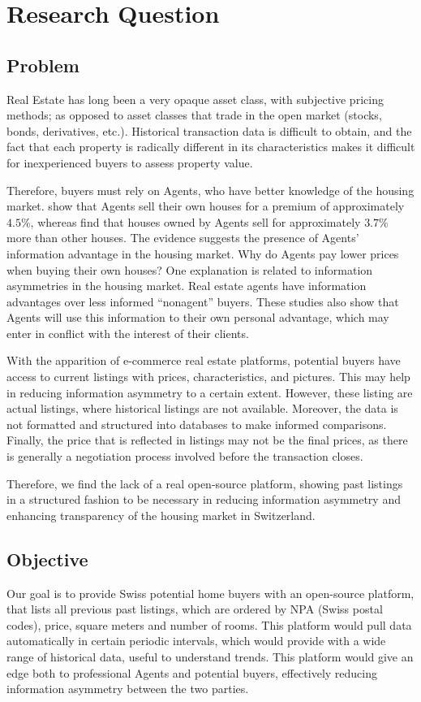 \documentclass[main]{subfiles}
\begin{document}
\section{Research Question}
\subsection{Problem}
Real Estate has long been a very opaque asset class, with subjective pricing methods; 
as opposed to asset classes that trade in the open market (stocks, bonds, derivatives, etc.). 
Historical transaction data is difficult to obtain, and the fact that each property is radically 
different in its characteristics makes it difficult for inexperienced buyers to assess property value. 

Therefore, buyers must rely on Agents, who have better knowledge of the housing market. 
\hly[Rutherford et al. (2005)] show that Agents sell their own houses for a premium of approximately $4.5\%$, 
whereas  find that houses owned by Agents sell for approximately $3.7\%$ more 
than other houses. The evidence suggests the presence of Agents' information advantage in the housing market. 
Why do Agents pay lower prices when buying their own houses? 
One explanation is related to information asymmetries in the housing market. 
Real estate agents have information advantages over less informed “nonagent” buyers. 
These studies also show that Agents will use this information to their own personal advantage, 
which may enter in conflict with the interest of their clients.

With the apparition of e-commerce real estate platforms, potential buyers have access to current listings with prices, characteristics,
and pictures. This may help in reducing information asymmetry to a certain extent. 
However, these listing are actual listings, where historical listings are not available. 
Moreover, the data is not formatted and structured into databases to make informed comparisons. 
Finally, the price that is reflected in listings may not be the final prices, 
as there is generally a negotiation process involved before the transaction closes.

Therefore, we find the lack of a real open-source platform, showing past listings in a structured fashion 
to be necessary in reducing information asymmetry and enhancing transparency of the housing market in Switzerland.

\subsection{Objective}
Our goal is to provide Swiss potential home buyers with an open-source platform, 
that lists all previous past listings, which are ordered by NPA (Swiss postal codes), 
price, square meters and number of rooms.
This platform would pull data automatically in certain periodic intervals, 
which would provide with a wide range of historical data, useful to understand trends. 
This platform would give an edge both to professional Agents and potential buyers,
effectively reducing information asymmetry between the two parties.
\end{document}
